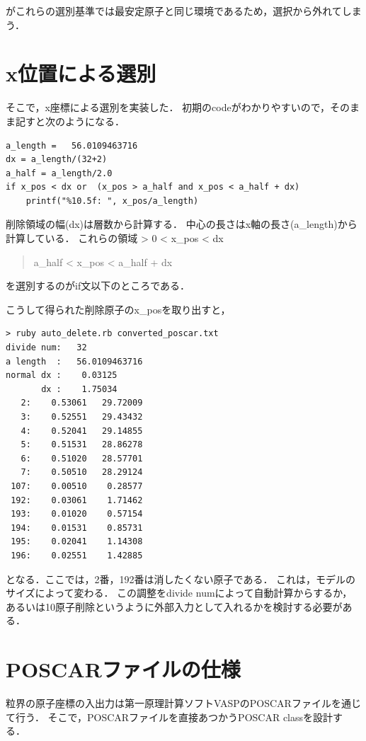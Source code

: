 がこれらの選別基準では最安定原子と同じ環境であるため，選択から外れてしまう．

    \section{x位置による選別}\label{xux4f4dux7f6eux306bux3088ux308bux9078ux5225}

そこで，x座標による選別を実装した．
初期のcodeがわかりやすいので，そのまま記すと次のようになる．

\begin{verbatim}
a_length =   56.0109463716
dx = a_length/(32+2)
a_half = a_length/2.0
if x_pos < dx or  (x_pos > a_half and x_pos < a_half + dx)
    printf("%10.5f: ", x_pos/a_length)
\end{verbatim}

削除領域の幅(dx)は層数から計算する．
中心の長さはx軸の長さ(a\_length)から計算している． これらの領域
\textgreater{} 0 \textless{} x\_pos \textless{} dx

\begin{quote}
a\_half \textless{} x\_pos \textless{} a\_half + dx
\end{quote}
を選別するのがif文以下のところである．

こうして得られた削除原子のx\_posを取り出すと，

\begin{verbatim}
> ruby auto_delete.rb converted_poscar.txt 
divide num:   32
a length  :   56.0109463716
normal dx :    0.03125
       dx :    1.75034
   2:    0.53061   29.72009
   3:    0.52551   29.43432
   4:    0.52041   29.14855
   5:    0.51531   28.86278
   6:    0.51020   28.57701
   7:    0.50510   28.29124
 107:    0.00510    0.28577
 192:    0.03061    1.71462
 193:    0.01020    0.57154
 194:    0.01531    0.85731
 195:    0.02041    1.14308
 196:    0.02551    1.42885
\end{verbatim}

となる．ここでは，2番，192番は消したくない原子である．
これは，モデルのサイズによって変わる． この調整をdivide
numによって自動計算からするか，
あるいは10原子削除というように外部入力として入れるかを検討する必要がある．

    \section{POSCARファイルの仕様}\label{poscarux30d5ux30a1ux30a4ux30ebux306eux4ed5ux69d8}

粒界の原子座標の入出力は第一原理計算ソフトVASPのPOSCARファイルを通じて行う．
そこで，POSCARファイルを直接あつかうPOSCAR classを設計する．

